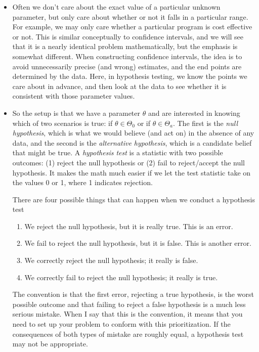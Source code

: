 \begin{itemize}

\item Often we don't care about the exact value of a particular
  unknown parameter, but only care about whether or not it falls in a
  particular range.  For example, we may only care whether a
  particular program is cost effective or not.  This is similar
  conceptually to confidence intervals, and we will see that it is a
  nearly identical problem mathematically, but the emphasis is
  somewhat different.  When constructing confidence intervals, the
  idea is to avoid unnecessarily precise (and wrong) estimates, and
  the end points are determined by the data.  Here, in hypothesis
  testing, we know the points we care about in advance, and then look
  at the data to see whether it is consistent with those parameter
  values.

\item So the setup is that we have a parameter $\theta$ and are interested
  in knowing which of two scenarios is true: if $\theta \in \Theta_0$ or if $\theta \in
  \Theta_a$.  The first is the \emph{null hypothesis}, which is what we
  would believe (and act on) in the absence of any data, and the
  second is the \emph{alternative hypothesis}, which is a candidate
  belief that might be true.  A \emph{hypothesis test} is a statistic
  with two possible outcomes: (1) reject the null hypothesis or (2)
  fail to reject/accept the null hypothesis.  It makes the math much
  easier if we let the test statistic take on the values 0 or 1, where
  1 indicates rejection.

  There are four possible things that can happen when we conduct a
  hypothesis test
  \begin{enumerate}
  \item We reject the null hypothesis, but it is really true.  This is
    an error.
  \item We fail to reject the null hypothesis, but it is false.  This
    is another error.
  \item We correctly reject the null hypothesis; it really is false.
  \item We correctly fail to reject the null hypothesis; it really is true.
  \end{enumerate}
  The convention is that the first error, rejecting a true hypothesis,
  is the worst possible outcome and that failing to reject a false
  hypothesis is a much less serious mistake.  When I say that this is
  the convention, it means that you need to set up your problem to
  conform with this prioritization.  If the consequences of both types
  of mistake are roughly equal, a hypothesis test may not be
  appropriate.


\end{itemize}
